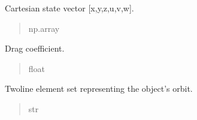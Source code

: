 \documentclass[letterpaper,10pt,english]{sphinxmanual}
\begin{document}
\begin{fulllineitems}
\begin{fulllineitems}
\begin{quote}
\begin{description}
\end{description}\end{quote}

\end{fulllineitems}


\begin{fulllineitems}
\label{\detokenize{fspsim.utils:fspsim.utils.SpaceObject.SpaceObject.cart_state}}
\pysigstartsignatures
{}
\pysigstopsignatures
\sphinxAtStartPar
Cartesian state vector {[}x,y,z,u,v,w{]}.
\begin{quote}\begin{description}
\sphinxAtStartPar
np.array

\end{description}\end{quote}

\end{fulllineitems}


\begin{fulllineitems}
\label{\detokenize{fspsim.utils:fspsim.utils.SpaceObject.SpaceObject.C_d}}
\pysigstartsignatures
{}
\pysigstopsignatures
\sphinxAtStartPar
Drag coefficient.
\begin{quote}\begin{description}
\sphinxAtStartPar
float

\end{description}\end{quote}

\end{fulllineitems}


\begin{fulllineitems}
\label{\detokenize{fspsim.utils:fspsim.utils.SpaceObject.SpaceObject.tle}}
\pysigstartsignatures
{}
\pysigstopsignatures
\sphinxAtStartPar
Two\sphinxhyphen{}line element set representing the object’s orbit.
\begin{quote}\begin{description}
\sphinxAtStartPar
str


\end{description}
\end{quote}
\end{fulllineitems}
\end{fulllineitems}
\end{document}

